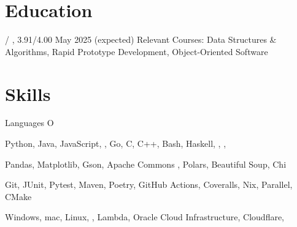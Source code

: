 \section{Education}
\begin{outline}
     / ,  3.91/4.00
    \hfill May 2025 (expected)
        \1 Relevant Courses: Data Structures \& Algorithms, Rapid Prototype Development, Object-Oriented Software
\end{outline}

\section{Skills}
\begin{labeling}{Languages O}
    \item [Languages] Python, Java, JavaScript, , Go, C, C++, Bash, Haskell, , , \textsmaller{\LaTeX}
    \item [Libraries] Pandas, Matplotlib, Gson, Apache Commons , Polars, Beautiful Soup, Chi
    \item [Tools] Git, JUnit, Pytest, Maven, Poetry, GitHub Actions, Coveralls, Nix,  Parallel, CMake
    \item [Platforms] Windows, mac, Linux, ,  Lambda, Oracle Cloud Infrastructure, Cloudflare, 
\end{labeling}

